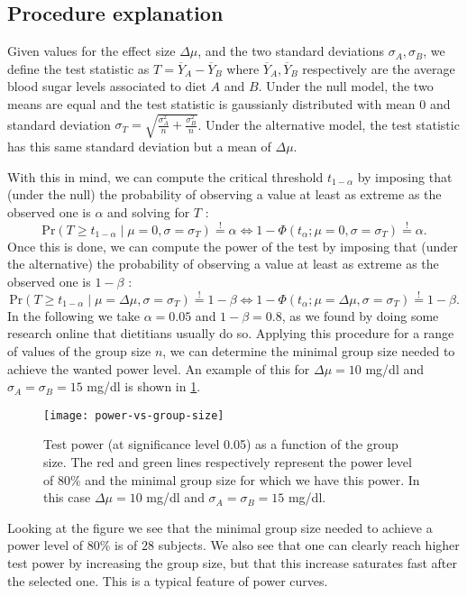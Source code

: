 \documentclass[a4paper, 12pt,oneside]{article}
\begin{document}
	\subsection{Procedure explanation}
	Given values for the effect size $\Delta \mu$, and the two standard deviations $\sigma_A,\sigma_B$, we define the test statistic as $T=\overline{Y}_A-\overline{Y}_B$ where $\overline{Y}_A,\overline{Y}_B$ respectively are the average blood sugar levels associated to diet $A$ and $B$. Under the null model, the two means are equal and the test statistic is gaussianly distributed with mean $0$ and standard deviation $\sigma_{T}=\sqrt{\frac{\sigma_A^2}{n}+\frac{\sigma_B^2}{n}}$. Under the alternative model, the test statistic has this same standard deviation but a mean of $\Delta \mu$.

	With this in mind, we can compute the critical threshold $t_{1-\alpha}$ by imposing that (under the null) the probability of observing a value at least as extreme as the observed one is $\alpha$ and solving for $T$ :
	$$
	\text{Pr}(T\geq t_{1-\alpha}\mid \mu=0, \sigma=\sigma_{T})\overset{!}{=}\alpha
	\iff 1-\Phi(t_{\alpha};\mu=0, \sigma=\sigma_{T})\overset{!}{=}\alpha.
	$$
	Once this is done, we can compute the power of the test by imposing that (under the alternative) the probability of observing a value at least as extreme as the observed one is $1-\beta$ :
	$$
	\text{Pr}(T\geq t_{1-\alpha}\mid \mu=\Delta\mu, \sigma=\sigma_{T})\overset{!}{=}1-\beta
	\iff 1-\Phi(t_{\alpha};\mu=\Delta\mu, \sigma=\sigma_{T})\overset{!}{=}1-\beta.
	$$
	In the following we take $\alpha=0.05$ and $1-\beta=0.8$, as we found by doing some research online that dietitians usually do so.
	Applying this procedure for a range of values of the group size $n$, we can determine the minimal group size needed to achieve the wanted power level. An example of this for $\Delta\mu=10$ mg/dl and $\sigma_A=\sigma_B=15$ mg/dl is shown in \ref{fig:power-vs-group-size}.	
	\begin{figure}[h!]
		\centering
		\vspace{0em}
		\texttt{[image: power-vs-group-size]}
		\caption{Test power (at significance level 0.05) as a function of the group size. The red and green lines respectively represent the power level of $80\%$ and the minimal group size for which we have this power. In this case $\Delta \mu=10$ mg/dl and $\sigma_A=\sigma_B=15$ mg/dl.}
		\label{fig:power-vs-group-size}
	\end{figure}
	Looking at the figure we see that the minimal group size needed to achieve a power level of $80\%$ is of $28$ subjects. We also see that one can clearly reach higher test power by increasing the group size, but that this increase saturates fast after the selected one. This is a typical feature of power curves. 
\end{document}
